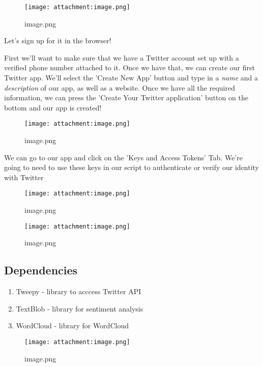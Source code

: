 \documentclass[11pt]{article}
\makeatletter
\def\maxwidth{\ifdim\Gin@nat@width>\linewidth\linewidth
    \else\Gin@nat@width\fi}
\let\Oldincludegraphics\includegraphics
\renewcommand{\includegraphics}[1]{\Oldincludegraphics[width=.8\maxwidth]{#1}}
\providecommand{\tightlist}{%
      \setlength{\itemsep}{0pt}\setlength{\parskip}{0pt}}
\makeatother
\begin{document}
    \begin{figure}
\centering
\texttt{[image: attachment:image.png]}
\caption{image.png}
\end{figure}

    Let's sign up for it in the browser!

First we'll want to make sure that we have a Twitter account set up with
a verified phone number attached to it. Once we have that, we can create
our first Twitter app. We'll select the 'Create New App' button and type
in a \emph{name} and a \emph{description} of our app, as well as a
website. Once we have all the required information, we can press the
'Create Your Twitter application' button on the bottom and our app is
created!

    \begin{figure}
\centering
\texttt{[image: attachment:image.png]}
\caption{image.png}
\end{figure}

    We can go to our app and click on the 'Keys and Access Tokens' Tab.
We're going to need to use these keys in our script to authenticate or
verify our identity with Twitter

    \begin{figure}
\centering
\texttt{[image: attachment:image.png]}
\caption{image.png}
\end{figure}

    \begin{figure}
\centering
\texttt{[image: attachment:image.png]}
\caption{image.png}
\end{figure}

    \subsection{Dependencies}\label{dependencies}

    \begin{enumerate}
\def\labelenumi{\arabic{enumi}.}
\tightlist
\item
  Tweepy - library to acccess Twitter API
\item
  TextBlob - library for sentiment analysis
\item
  WordCloud - library for WordCloud
\end{enumerate}

    \begin{figure}
\centering
\texttt{[image: attachment:image.png]}
\caption{image.png}
\end{figure}
\end{document}
